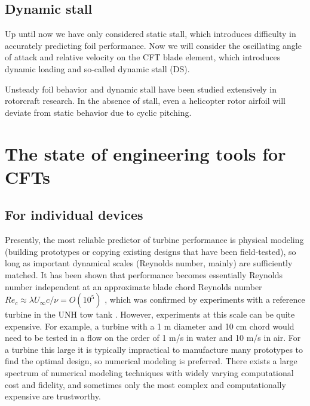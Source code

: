 \subsection{Dynamic stall}

Up until now we have only considered static stall, which introduces difficulty
in accurately predicting foil performance. Now we will consider the oscillating
angle of attack and relative velocity on the CFT blade element, which introduces
dynamic loading and so-called dynamic stall (DS).

Unsteady foil behavior and dynamic stall have been studied extensively in
rotorcraft research. In the absence of stall, even a helicopter rotor airfoil
will deviate from static behavior due to cyclic pitching.



\section{The state of engineering tools for CFTs}

\subsection{For individual devices}

Presently, the most reliable predictor of turbine performance is physical
modeling (building prototypes or copying existing designs that have been
field-tested), so long as important dynamical scales (Reynolds number, mainly)
are sufficiently matched. It has been shown that performance becomes essentially
Reynolds number independent at an approximate blade chord Reynolds number $Re_c
\approx \lambda U_\infty c / \nu = O(10^5)$ \cite{Bravo2007}, which was
confirmed by experiments with a reference turbine in the UNH tow tank
\cite{Bachant2014}. However, experiments at this scale can be quite expensive.
For example, a turbine with a 1 m diameter and 10 cm chord would need to be
tested in a flow on the order of 1 m/s in water and 10 m/s in air. For a turbine
this large it is typically impractical to manufacture many prototypes to find
the optimal design, so numerical modeling is preferred. There exists a large
spectrum of numerical modeling techniques with widely varying computational cost
and fidelity, and sometimes only the most complex and computationally expensive
are trustworthy.

